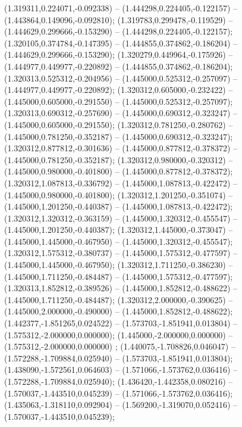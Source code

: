  (1.319311,0.224071,-0.092338) -- (1.444298,0.224405,-0.122157) -- (1.443864,0.149096,-0.092810);
 (1.319783,0.299478,-0.119529) -- (1.444629,0.299666,-0.153290) -- (1.444298,0.224405,-0.122157);
 (1.320105,0.374784,-0.147395) -- (1.444855,0.374862,-0.186204) -- (1.444629,0.299666,-0.153290);
 (1.320279,0.449964,-0.175926) -- (1.444977,0.449977,-0.220892) -- (1.444855,0.374862,-0.186204);
 (1.320313,0.525312,-0.204956) -- (1.445000,0.525312,-0.257097) -- (1.444977,0.449977,-0.220892);
 (1.320312,0.605000,-0.232422) -- (1.445000,0.605000,-0.291550) -- (1.445000,0.525312,-0.257097);
 (1.320313,0.690312,-0.257690) -- (1.445000,0.690312,-0.323247) -- (1.445000,0.605000,-0.291550);
 (1.320312,0.781250,-0.280762) -- (1.445000,0.781250,-0.352187) -- (1.445000,0.690312,-0.323247);
 (1.320312,0.877812,-0.301636) -- (1.445000,0.877812,-0.378372) -- (1.445000,0.781250,-0.352187);
 (1.320312,0.980000,-0.320312) -- (1.445000,0.980000,-0.401800) -- (1.445000,0.877812,-0.378372);
 (1.320312,1.087813,-0.336792) -- (1.445000,1.087813,-0.422472) -- (1.445000,0.980000,-0.401800);
 (1.320312,1.201250,-0.351074) -- (1.445000,1.201250,-0.440387) -- (1.445000,1.087813,-0.422472);
 (1.320312,1.320312,-0.363159) -- (1.445000,1.320312,-0.455547) -- (1.445000,1.201250,-0.440387);
 (1.320312,1.445000,-0.373047) -- (1.445000,1.445000,-0.467950) -- (1.445000,1.320312,-0.455547);
 (1.320312,1.575312,-0.380737) -- (1.445000,1.575312,-0.477597) -- (1.445000,1.445000,-0.467950);
 (1.320312,1.711250,-0.386230) -- (1.445000,1.711250,-0.484487) -- (1.445000,1.575312,-0.477597);
 (1.320313,1.852812,-0.389526) -- (1.445000,1.852812,-0.488622) -- (1.445000,1.711250,-0.484487);
 (1.320312,2.000000,-0.390625) -- (1.445000,2.000000,-0.490000) -- (1.445000,1.852812,-0.488622);
 (1.442377,-1.851265,0.024522) -- (1.573703,-1.851941,0.013804) -- (1.575312,-2.000000,0.000000);
 (1.445000,-2.000000,0.000000) -- (1.575312,-2.000000,0.000000) ;
 (1.440075,-1.708826,0.046047) -- (1.572288,-1.709884,0.025940) -- (1.573703,-1.851941,0.013804);
 (1.438090,-1.572561,0.064603) -- (1.571066,-1.573762,0.036416) -- (1.572288,-1.709884,0.025940);
 (1.436420,-1.442358,0.080216) -- (1.570037,-1.443510,0.045239) -- (1.571066,-1.573762,0.036416);
 (1.435063,-1.318110,0.092904) -- (1.569200,-1.319070,0.052416) -- (1.570037,-1.443510,0.045239);
